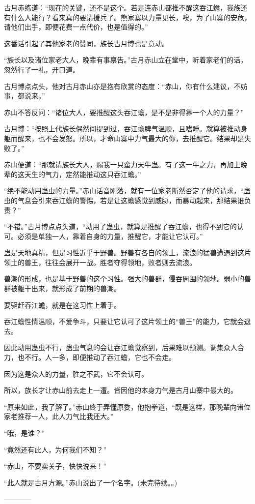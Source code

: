 \begin{this_body}
古月赤练道：“现在的关键，还不是这个。若是连赤山都推不醒这吞江蟾，我族还有什么人能行？看来真的要请援兵了。熊家寨以力量见长，唉，为了山寨的安危，请他们出手，即便花费一点代价，也是值得的。”

这番话引起了其他家老的赞同，族长古月博也是意动。

“族长以及诸位家老大人，晚辈有事禀告。”古月赤山立在堂中，听着家老们的话，忽然行了一礼，开口道。

古月博点点头，他对古月赤山亦是抱有欣赏的态度：“赤山，你有什么建议，不妨事，都说来。”

赤山不答反问：“诸位大人，要推醒这头吞江蟾，是不是非得靠一个人的力量？”

古月博：“按照上代族长偶然间提到过，吞江蟾脾气温顺，且嗜睡。就算被推动身躯而醒来，也不会发怒。所以，才命山寨中力气最大的你，去推醒它。结果却是失败了。”

赤山便道：“那就请族长大人，赐我一只蛮力天牛蛊。有了这一牛之力，再加上晚辈的这天生的气力，定然能推动这只吞江蟾。”

“绝不能动用蛊虫的力量。”赤山话音刚落，就有一位家老断然否定了他的请求，“蛊虫的气息会引来吞江蟾的警惕，若是让这蟾感觉到威胁，而暴动起来，那结果谁负责？”

“不错。”古月博点点头道，“动用了蛊虫，就算是推醒了吞江蟾，也得不到它的认可。必须是单独一人，靠着自身的力量，推醒它，才能让它认可。”

蛊是天地真精，但是习性近乎于野兽。野兽有各自的领土，流浪的猛兽遭遇到这片领土的兽王，往往会展开一战。胜者夺得领地，败者则去流浪。

兽潮的形成，也是基于野兽的这个习性。强大的兽群，侵吞周围的领地。弱小的兽群被躯干出来，就形成了前期的兽潮。

要驱赶吞江蟾，就是在这习性上着手。

吞江蟾性情温顺，不爱争斗，只要让它认可了这片领土的“兽王”的能力，它就会退去。

因此动用蛊虫不行，蛊虫气息的会让吞江蟾觉察到，后果难以预测。调集众人合力，也不行。人一多，即便推动了吞江蟾，它也不会走。

因为这是众人的力量，胜之不武，它不会认可。

所以，族长才让赤山前去走上一遭。皆因他的本身力气是古月山寨中最大的。

“原来如此，我了解了。”赤山终于弄懂原委，他抱拳道，“既是这样，那晚辈向诸位家老推荐一人，此人力气比我还大。”

“哦，是谁？”

“竟然还有此人，为何我们不知？”

“赤山，不要卖关子，快快说来！”

“此人就是古月方源。”赤山说出了一个名字。(未完待续。。)

------------

\end{this_body}


